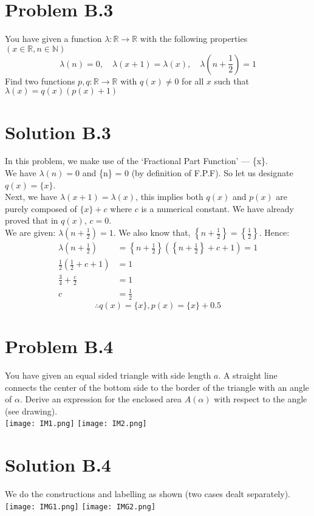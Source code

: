 \documentclass{article}
\begin{document}
\newpage
\section*{Problem B.3}
You have given a function $\lambda: \mathbb{R} \rightarrow \mathbb{R}$ with the following properties $(x \in \mathbb{R}, n \in \mathbb{N})$
\[
\lambda(n)=0, \quad \lambda(x+1)=\lambda(x), \quad \lambda\left(n+\frac{1}{2}\right)=1
\]
Find two functions $p, q: \mathbb{R} \rightarrow \mathbb{R}$ with $q(x) \neq 0$ for all $x$ such that $\lambda(x)=q(x)(p(x)+1)$
\section*{Solution B.3}
In this problem, we make use of the `Fractional Part Function' --- \{x\}. \\
We have $\lambda(n)=0$ and \{n\} = 0 (by definition of F.P.F). So let us designate $q(x)=\{x\}$. \\
Next, we have $\lambda(x+1)=\lambda(x)$, this implies both $q(x)$ and $p(x)$ are purely composed of $\{x\}+c$ where $c$ is a numerical constant. We have already proved that in $q(x)$, $c=0$. \\
We are given: $\lambda\left(n+\frac{1}{2}\right)=1$. We also know that, $\left\{n+\frac{1}{2}\right\}=\left\{\frac{1}{2}\right\}$. Hence:
\begin{align*}
    \lambda\left(n+\frac{1}{2}\right)&=\left\{n+\frac{1}{2}\right\}\left(\left\{n+\frac{1}{2}\right\}+c+1\right)=1\\
    \frac{1}{2}\left(\frac{1}{2}+c+1\right)&=1 \\
    \frac{3}{4}+\frac{c}{2}&=1 \\
    c&=\frac{1}{2}
\end{align*}
\[\boxed{\therefore q(x)=\{x\}, p(x)=\{x\}+0.5}\]

\newpage
\section*{Problem B.4}
You have given an equal sided triangle with side length $a$. A straight line connects the center of the bottom side to the border of the triangle with an angle of $\alpha$. Derive an expression for the enclosed area $A(\alpha)$ with respect to the angle (see drawing). \\
\texttt{[image: IM1.png]}
\qquad
\texttt{[image: IM2.png]}
\section*{Solution B.4}
We do the constructions and labelling as shown (two cases dealt separately).
\texttt{[image: IMG1.png]}
\qquad
\texttt{[image: IMG2.png]}
\end{document}

